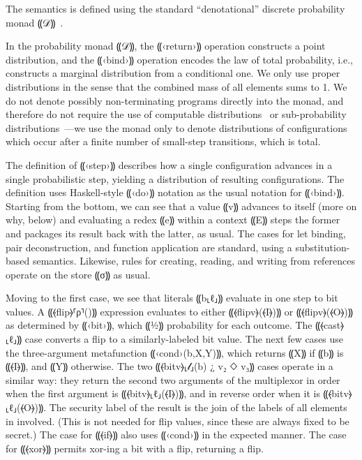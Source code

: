 The semantics is defined using the standard “denotational” discrete probability monad
⸨𝒟⸩~\cite{10.1007/BFb0092872,Ramsey:2002:SLC:503272.503288}.

In the probability monad ⸨𝒟⸩, the ⸨‹return›⸩ operation constructs a point
distribution, and the ⸨‹bind›⸩ operation encodes the law of total probability,
{i.e.}, constructs a marginal distribution from a conditional one. We only use
proper distributions in the sense that the combined mass of all elements sums
to 1. We do not denote possibly non-terminating programs directly into the
monad, and therefore do not require the use of computable
distributions~\cite{huang-computable-distributions} or
sub-probability distributions~\cite{monniaux-ai-prob}—we use the monad only to denote distributions of
configurations which occur after a finite number of small-step transitions,
which is total.

The definition of ⸨‹step›⸩ describes how a single configuration advances in a
single probabilistic step, yielding a distribution of resulting configurations.
The definition uses Haskell-style ⸨‹do›⸩ notation as the usual notation for
⸨‹bind›⸩. Starting from the bottom, we can see that a value ⸨v⸩ advances to
itself (more on why, below) and evaluating a redex ⸨e⸩ within a context ⸨E⸩
steps the former and packages its result back with the latter, as usual. The
cases for let binding, pair deconstruction, and function application are
standard, using a substitution-based semantics. Likewise, rules for creating,
reading, and writing from references operate on the store ⸨σ⸩ as
usual.

Moving to the first case, we see that literals ⸨b⸤ℓ⸥⸩ evaluate in one
step to bit values. A ⸨⦑flip⦒⸢ρ⸣()⸩ expression evaluates to either
⸨⦑flipv⦒(⦑I⦒)⸩ or ⸨⦑flipv⦒(⦑O⦒)⸩ as determined by ⸨‹bit›⸩, which ⸨½⸩
probability for each outcome.
%
The ⸨⦑cast⦒⸤ℓ⸥⸩ case converts a flip to a similarly-labeled bit value.
%
The next few cases use the three-argument metafunction ⸨‹cond›(b,X,Y)⸩, which
returns ⸨X⸩ if ⸨b⸩ is ⸨⦑I⦒⸩, and ⸨Y⸩ otherwise.
%
The two ⸨⦑bitv⦒⸤𝓁⸥(b) ¿ v₂ ◇ v₃⸩ cases operate in a similar way: they return the
second two arguments of the multiplexor in order when the first
argument is ⸨⦑bitv⦒⸤ℓ⸥(⦑I⦒)⸩, and in reverse order when it is
⸨⦑bitv⦒⸤ℓ⸥(⦑O⦒)⸩. The security label of the result is the join of the labels of
all elements in involved. (This is not needed for flip values, since these are
always fixed to be secret.)
%
The case for ⸨⦑if⦒⸩ also uses ⸨‹cond›⸩ in the expected manner. The
case for ⸨⦑xor⦒⸩ permits xor-ing a bit with a flip, returning a
flip.

